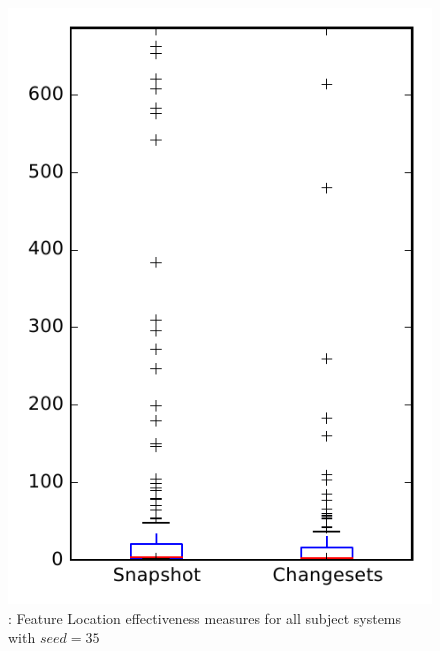 
\begin{figure}
\centering
\includegraphics[height=0.4\textheight]{figures/flt_seed/rq1_overview_35}
\caption{\rone: Feature Location effectiveness measures for all subject systems with $seed=35$}
\label{fig:flt_seed:rq1:overview}
\end{figure}
